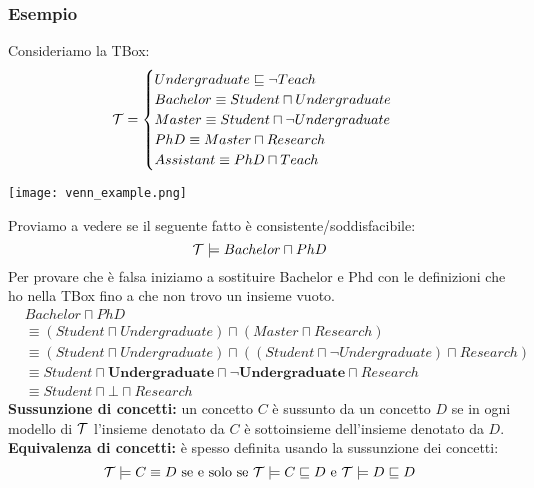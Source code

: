 \documentclass[../main.tex]{subfiles}
\begin{document}
   \subsubsection{Esempio}
   Consideriamo la TBox:
   \begin{equation*}
      \mathcal{T}=
      \begin{cases}
         Undergraduate \sqsubseteq \lnot Teach\\
         Bachelor \equiv Student \sqcap Undergraduate\\
         Master \equiv Student \sqcap \lnot Undergraduate\\
         PhD \equiv Master \sqcap Research\\
         Assistant \equiv PhD \sqcap Teach\\
      \end{cases}
   \end{equation*}
   \begin{center}
      \texttt{[image: venn\_example.png]}
   \end{center}
   Proviamo a vedere se il seguente fatto è consistente/soddisfacibile:
   \begin{equation*}
      \mathcal{T} \models Bachelor \sqcap PhD
   \end{equation*}
   Per provare che è falsa iniziamo a sostituire Bachelor e Phd con le definizioni che ho nella TBox fino a che non trovo un insieme vuoto.
   \begin{align*}
      &Bachelor \sqcap PhD\\
      &\equiv (Student \sqcap Undergraduate) \sqcap (Master \sqcap Research)\\
      &\equiv (Student \sqcap Undergraduate) \sqcap ((Student \sqcap \lnot Undergraduate) \sqcap Research)\\
      &\equiv Student \sqcap \textbf{Undergraduate} \sqcap \lnot \textbf{Undergraduate} \sqcap Research\\
      &\equiv Student \sqcap \bot \sqcap Research
   \end{align*}
   \spazio
   \textbf{Sussunzione di concetti:} un concetto $C$ è sussunto da un concetto $D$ se in ogni modello di $\mathcal{T}$ l'insieme denotato da $C$ è sottoinsieme dell'insieme denotato da $D$.
   \spazio
   \textbf{Equivalenza di concetti:} è spesso definita usando la sussunzione dei concetti:
   \begin{equation*}
      \mathcal{T} \models C \equiv D\ \text{se e solo se}\ \mathcal{T} \models C \sqsubseteq D\ \text{e}\ \mathcal{T} \models D \sqsubseteq D
   \end{equation*}
\end{document}
